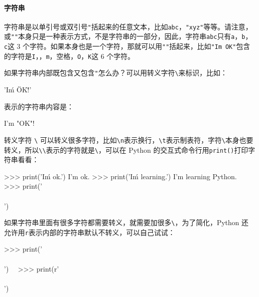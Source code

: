 \hypertarget{ux5b57ux7b26ux4e32}{%
\paragraph{字符串}\label{ux5b57ux7b26ux4e32}}

字符串是以单引号\texttt{\textquotesingle{}}或双引号\texttt{"}括起来的任意文本，比如\texttt{\textquotesingle{}abc\textquotesingle{}}，\texttt{"xyz"}等等。请注意，\texttt{\textquotesingle{}\textquotesingle{}}或\texttt{""}本身只是一种表示方式，不是字符串的一部分，因此，字符串\texttt{\textquotesingle{}abc\textquotesingle{}}只有\texttt{a}，\texttt{b}，\texttt{c}这
3
个字符。如果\texttt{\textquotesingle{}}本身也是一个字符，那就可以用\texttt{""}括起来，比如\texttt{"I\textquotesingle{}m\ OK"}包含的字符是\texttt{I}，\texttt{\textquotesingle{}}，\texttt{m}，空格，\texttt{O}，\texttt{K}这
6 个字符。

如果字符串内部既包含\texttt{\textquotesingle{}}又包含\texttt{"}怎么办？可以用转义字符\texttt{\textbackslash{}}来标识，比如：

\begin{pythoncode}
'I\'m \"OK\"!'
\end{pythoncode}

表示的字符串内容是：

\begin{pythoncode}
I'm "OK"!
\end{pythoncode}

转义字符 \texttt{\textbackslash{}}
可以转义很多字符，比如\texttt{\textbackslash{}n}表示换行，\texttt{\textbackslash{}t}表示制表符，字符\texttt{\textbackslash{}}本身也要转义，所以\texttt{\textbackslash{}\textbackslash{}}表示的字符就是\texttt{\textbackslash{}}，可以在
Python 的交互式命令行用\texttt{print()}打印字符串看看：

\begin{pythoncode}
>>> print('I\'m ok.')
I'm ok.
>>> print('I\'m learning\nPython.')
I'm learning
Python.
>>> print('\\\n\\')
\
\
\end{pythoncode}

如果字符串里面有很多字符都需要转义，就需要加很多\texttt{\textbackslash{}}，为了简化，Python
还允许用\texttt{r\textquotesingle{}\textquotesingle{}}表示\texttt{\textquotesingle{}\textquotesingle{}}内部的字符串默认不转义，可以自己试试：

\begin{pythoncode}
>>> print('\\\t\\')
\       \
>>> print(r'\\\t\\')
\\\t\\
\end{pythoncode}

